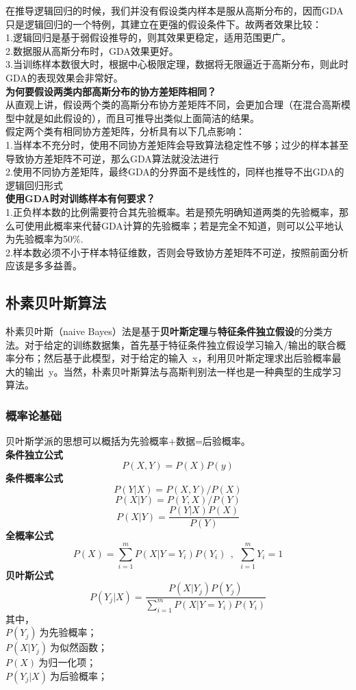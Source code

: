 在推导逻辑回归的时候，我们并没有假设类内样本是服从高斯分布的，因而GDA只是逻辑回归的一个特例，其建立在更强的假设条件下。故两者效果比较：\\
1.逻辑回归是基于弱假设推导的，则其效果更稳定，适用范围更广。\\
2.数据服从高斯分布时，GDA效果更好。\\
3.当训练样本数很大时，根据中心极限定理，数据将无限逼近于高斯分布，则此时GDA的表现效果会非常好。\\

\noindent\textbf{为何要假设两类内部高斯分布的协方差矩阵相同？}\\
从直观上讲，假设两个类的高斯分布协方差矩阵不同，会更加合理（在混合高斯模型中就是如此假设的），而且可推导出类似上面简洁的结果。\\
假定两个类有相同协方差矩阵，分析具有以下几点影响：\\
1.当样本不充分时，使用不同协方差矩阵会导致算法稳定性不够；过少的样本甚至导致协方差矩阵不可逆，那么GDA算法就没法进行\\
2.使用不同协方差矩阵，最终GDA的分界面不是线性的，同样也推导不出GDA的逻辑回归形式\\

\noindent\textbf{使用GDA时对训练样本有何要求？}\\
1.正负样本数的比例需要符合其先验概率。若是预先明确知道两类的先验概率，那么可使用此概率来代替GDA计算的先验概率；若是完全不知道，则可以公平地认为先验概率为50\%.\\
2.样本数必须不小于样本特征维数，否则会导致协方差矩阵不可逆，按照前面分析应该是多多益善。

\newpage
\subsection{朴素贝叶斯算法}
朴素贝叶斯（naive Bayes）法是基于\textbf{贝叶斯定理}与\textbf{特征条件独立假设}的分类方法。对于给定的训练数据集，首先基于特征条件独立假设学习输入/输出的联合概率分布；然后基于此模型，对于给定的输入~x，利用贝叶斯定理求出后验概率最大的输出~y。当然，朴素贝叶斯算法与高斯判别法一样也是一种典型的生成学习算法。

\subsubsection{概率论基础}
贝叶斯学派的思想可以概括为先验概率+数据=后验概率。\\
\noindent\textbf{条件独立公式}\\
$$P(X,Y)=P(X)P(y)$$
\noindent\textbf{条件概率公式}\\
$$P(Y|X)=P(X,Y)/P(X)$$
$$P(X|Y)=P(Y,X)/P(Y)$$
$$P(X|Y)=\frac{P(Y|X)P(X)}{P(Y)}$$
\noindent\textbf{全概率公式}\\
$$P(X)=\sum_{i=1}^{m}P(X|Y=Y_i)P(Y_i)~~,~~\sum_{i=1}^{m}Y_i=1$$
\noindent\textbf{贝叶斯公式}\\
$$P(Y_j|X)=\frac{P(X|Y_j)P(Y_j)}{\sum_{i=1}^{m}P(X|Y=Y_i)P(Y_i)}$$
其中，\\
$P(Y_j)~$为先验概率；\\
$P(X|Y_j)~$为似然函数；\\
$P(X)~$为归一化项；\\
$P(Y_j|X)~$为后验概率；\\

